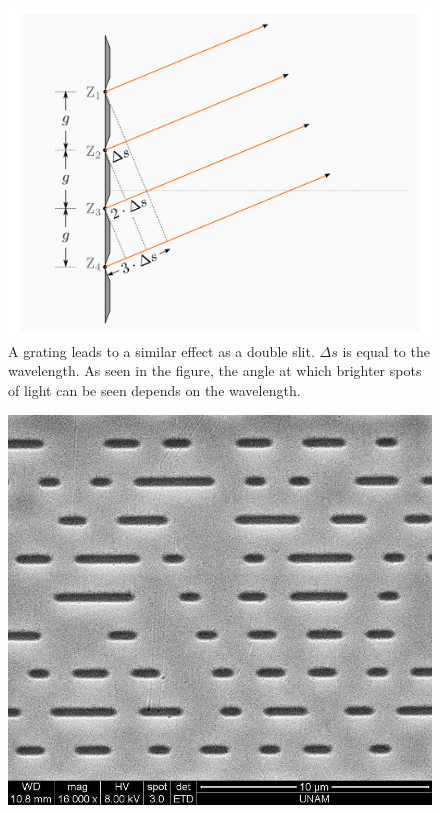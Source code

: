     \begin{minipage}{0.99\linewidth}
        \begin{minipage}{0.7\linewidth}
            \begin{figure}[H]
                \centering
                \includegraphics[scale = 0.25]{src/images/interference_grating.png}
                \caption{A grating leads to a similar effect as a double slit.
                $\Delta s$ is equal to the wavelength.
                As seen in the figure, the angle at which brighter spots of light can be seen depends on the wavelength. \cite{src_grating}}
                \label{fig_grating}
            \end{figure}
        \end{minipage}
        \begin{minipage}{0.25\linewidth}
          \begin{scriptsize}
            \begin{center}
                \begin{figure}[H]
                    \centering
                    \includegraphics[scale = 0.15]{src/images/lands_pits_cd.png}

\end{figure}
\end{center}
\end{scriptsize}
\end{minipage}
\end{minipage}
